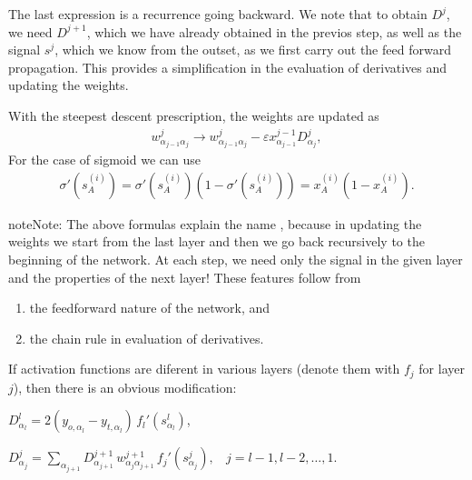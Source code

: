 \documentclass[letterpaper,10pt,english]{jupyterBook}
\begin{document}
\sphinxAtStartPar
The last expression is a recurrence going backward. We note that to obtain \(D^j\), we need \(D^{j+1}\), which we have already obtained in the previos step, as well as the signal \(s^j\), which we know from the outset, as we first carry out the feed forward propagation. This provides a simplification in the evaluation of derivatives and updating the weights.

\sphinxAtStartPar
With the steepest descent prescription, the weights are updated as
\begin{equation*}
\begin{split} w^j_{\alpha_{j-1} \alpha_j} \to  w^j_{\alpha_{j-1} \alpha_j} -\varepsilon x_{\alpha_{j-1}}^{j-1} D_{\alpha_j}^{j}, \end{split}
\end{equation*}
\sphinxAtStartPar
For the case of sigmoid we can use
\begin{equation*}
\begin{split}
\sigma'(s_A^{(i)})=\sigma'(s_A^{(i)}) (1-\sigma'(s_A^{(i)})) =x_A^{(i)}(1-x_A^{(i)}).
\end{split}
\end{equation*}
\begin{sphinxadmonition}{note}{Note:}
\sphinxAtStartPar
The above formulas explain the name , because in updating the weights we start from the last layer and then we go back recursively to the beginning of the network. At each step, we need only the signal in the given layer and the properties of the next layer! These features follow from
\begin{enumerate}
%
\item {} 
\sphinxAtStartPar
the feed\sphinxhyphen{}forward nature of the network, and

\item {} 
\sphinxAtStartPar
the chain rule in evaluation of derivatives.

\end{enumerate}
\end{sphinxadmonition}

\sphinxAtStartPar
If activation functions are diferent in various layers (denote them with \(f_j\) for layer \(j\)), then there is an obvious modification:

\sphinxAtStartPar
\(D_{\alpha_l}^{l}=2 (y_{o,\alpha_l}-y_{t,\alpha_l})\, f_l'(s_{\alpha_l}^{l})\),

\sphinxAtStartPar
\(D_{\alpha_j}^{j}= \sum_{\alpha_{j+1}} D_{\alpha_{j+1}}^{j+1}\, w_{\alpha_j \alpha_{j+1}}^{j+1} \, f_j'(s_{\alpha_j}^{j}), ~~~~ j=l-1,l-2,\dots,1\).
\end{document}
